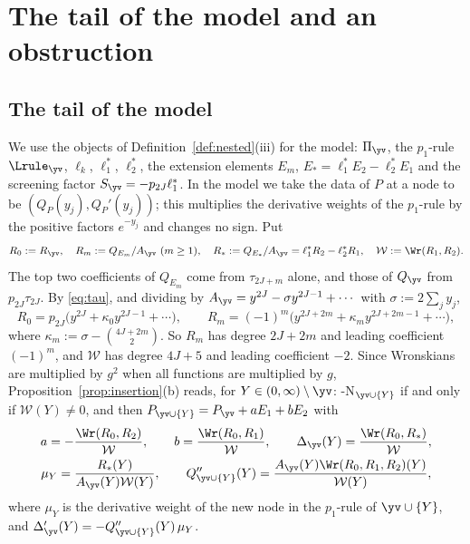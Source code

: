 \section{The tail of the model and an obstruction}\label{sec:model-tail}

\subsection{The tail of the model}\label{ssec:toy-tail}

We use the objects of Definition~\ref{def:nested}(iii) for the model: $\Pi_{\yv}$, the $p_1$-rule $\Lrule_{\yv}$,
$\ell_k$, $\ell_1^*$, $\ell_2^*$, the extension elements $E_m$, $E_*=\ell_1^*E_2-\ell_2^*E_1$ and the screening factor
$S_{\yv}=-p_{2J}\ell_1^*$. In the model we take the data of $P$ at a node to be $(Q_P(y_j),Q_P'(y_j))$; this multiplies
the derivative weights of the $p_1$-rule by the positive factors $e^{-y_j}$ and changes no sign. Put
\[
  R_0:=R_{\yv},\quad R_m:=Q_{E_m}/A_{\yv}\ (m\ge1),\quad R_*:=Q_{E_*}/A_{\yv}=\ell_1^*R_2-\ell_2^*R_1,
  \quad \mathcal W:=\Wr(R_1,R_2).
\]
The top two coefficients of $Q_{E_m}$ come from $\tau_{2J+m}$ alone, and those of $Q_{\yv}$ from $p_{2J}\tau_{2J}$. By
\eqref{eq:tau}, and dividing by $A_{\yv}=y^{2J}-\sigma y^{2J-1}+\cdots$ with $\sigma:=2\sum_jy_j$,
\begin{equation}\label{eq:Rtop}
  R_0=p_{2J}\bigl(y^{2J}+\kappa_0y^{2J-1}+\cdots\bigr),\qquad R_m=(-1)^m\bigl(y^{2J+2m}+\kappa_my^{2J+2m-1}+\cdots\bigr),
\end{equation}
where $\kappa_m:=\sigma-\binom{4J+2m}{2}$. So $R_m$ has degree $2J+2m$ and leading coefficient $(-1)^m$, and $\mathcal W$ has degree $4J+5$ and leading coefficient
$-2$. Since Wronskians are multiplied by $g^2$ when all functions are multiplied by $g$,
Proposition~\ref{prop:insertion}(b) reads, for $Y\in(0,\infty)\setminus\yv$: \hyp{N}$_{\yv\cup\{Y\}}$ if and only if
$\mathcal W(Y)\neq0$, and then $P_{\yv\cup\{Y\}}=P_{\yv}+aE_1+bE_2$ with
\begin{equation}\label{eq:toy-insertion}
  \begin{gathered}
  a=-\frac{\Wr(R_0,R_2)}{\mathcal W},\qquad b=\frac{\Wr(R_0,R_1)}{\mathcal W},\qquad
  \Delta_{\yv}(Y)=\frac{\Wr(R_0,R_*)}{\mathcal W},\\
  \mu_Y=\frac{R_*(Y)}{A_{\yv}(Y)\mathcal W(Y)},\qquad
  Q''_{\yv\cup\{Y\}}(Y)=\frac{A_{\yv}(Y)\Wr(R_0,R_1,R_2)(Y)}{\mathcal W(Y)},
  \end{gathered}
\end{equation}
where $\mu_Y$ is the derivative weight of the new node in the $p_1$-rule of $\yv\cup\{Y\}$, and
$\Delta_{\yv}'(Y)=-Q''_{\yv\cup\{Y\}}(Y)\,\mu_Y$.


